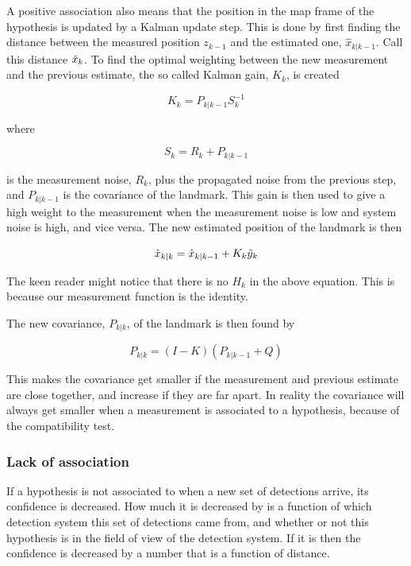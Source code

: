 A positive association also means that the position in the map frame of the hypothesis is updated by a Kalman update step. This is done by first finding the distance between the measured position $z_{k-1}$ and the estimated one, $\hat{x}_{k|k-1}$. Call this distance $\Tilde{x}_k$. To find the optimal weighting between the new measurement and the previous estimate, the so called Kalman gain, $K_k$, is created

\begin{equation}
    K_k = P_{k|k-1}S^{-1}_k
\end{equation}

where 

\begin{equation}
    S_k = R_k + P_{k|k-1}
\end{equation}

is the measurement noise, $R_k$, plus the propagated noise from the previous step, and $P_{k|k-1}$ is the covariance of the landmark. This gain is then used to give a high weight to the measurement when the measurement noise is low and system noise is high, and vice versa. The new estimated position of the landmark is then

\begin{equation}
    \hat{x}_{k|k} = \hat{x}_{k|k-1} + K_k\Tilde{y}_k
\end{equation}

The keen reader might notice that there is no $H_k$ in the above equation. This is because our measurement function is the identity. 

The new covariance, $P_{k|k}$, of the landmark is then found by  

\begin{equation}
    P_{k|k} = (I-K)(P_{k|k-1} + Q)
\end{equation}

This makes the covariance get smaller if the measurement and previous estimate are close together, and increase if they are far apart. In reality the covariance will always get smaller when a measurement is associated to a hypothesis, because of the compatibility test. 

\subsubsection{Lack of association}

If a hypothesis is not associated to when a new set of detections arrive, its confidence is decreased. How much it is decreased by is a function of which detection system this set of detections came from, and whether or not this hypothesis is in the field of view of the detection system. If it is then the confidence is decreased by a number that is a function of distance. 

